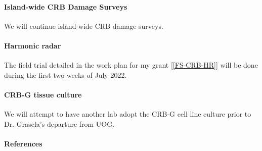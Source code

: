\begin{refsection}
\paragraph{Island-wide CRB Damage Surveys} We will continue island-wide CRB damage surveys.

\paragraph{Harmonic radar} The field trial detailed in the work plan for my grant [\ref{FS-CRB-HR}] will be done during the first two weeks of July 2022. 

\paragraph{CRB-G tissue culture} We will attempt to have another lab adopt the CRB-G cell line culture prior to Dr. Grasela's departure from UOG.

\paragraph{References}
\printbibliography[heading=none]

\end{refsection}


